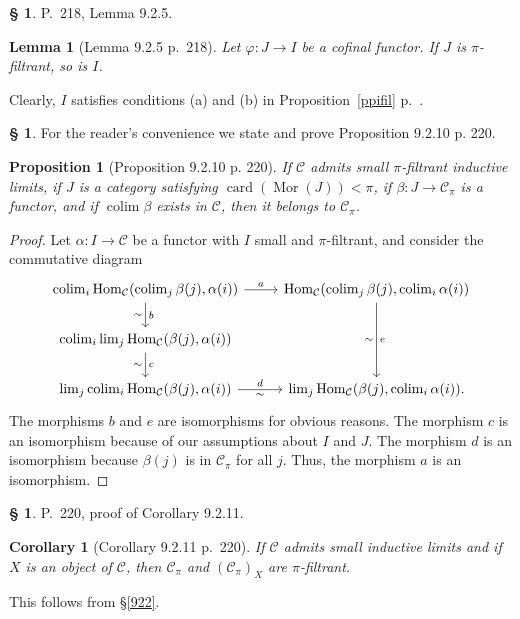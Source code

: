\documentclass[12pt]{article}
\newtheorem{lem}[thm]{Lemma}
\newtheorem{prop}[thm]{Proposition}
\newtheorem{cor}[thm]{Corollary}
\theoremstyle{remark}
\theoremstyle{definition}
\newtheorem{s}[thm]{\S}
\newcommand{\C}{\mathcal C}
\newcommand{\pp}{\varphi}
\DeclareMathOperator*{\colim}{colim}
\DeclareMathOperator{\card}{card}
\DeclareMathOperator{\Hom}{Hom}
\DeclareMathOperator{\Mor}{Mor}
\begin{document}
%

\begin{s}
P.~218, Lemma 9.2.5. 

\begin{lem}[Lemma 9.2.5 p.~218] 
Let $\pp:J\to I$ be a cofinal functor. If $J$ is $\pi$-filtrant, so is $I$.
\end{lem}

Clearly, $I$ satisfies conditions (a) and (b) in Proposition~\ref{ppifil} p.~\pageref{ppifil}. 
\end{s}

%

\begin{s}
For the reader's convenience we state and prove Proposition 9.2.10 p. 220. 

\begin{prop}[Proposition 9.2.10 p. 220]
If $\C$ admits small $\pi$-filtrant inductive limits, if $J$ is a category satisfying $\card(\Mor(J))<\pi$, if $\beta:J\to\C_\pi$ is a functor, and if $\colim\beta$ exists in $\C$, then it belongs to $\C_\pi$. 
\end{prop}

\begin{proof}
Let $\alpha:I\to\C$ be a functor with $I$ small and $\pi$-filtrant, and consider the commutative diagram
$$
\begin{tikzcd}
\colim_i\Hom_\C(\colim_j\beta(j),\alpha(i))\ar{r}{a}\ar{d}{b}[swap]{\sim}&\Hom_\C(\colim_j\beta(j),\colim_i\alpha(i))\ar{dd}{e}[swap]{\sim}\\ 
\colim_i\lim_j\Hom_\C(\beta(j),\alpha(i))\ar{d}{c}[swap]{\sim}\\ 
\lim_j\colim_i\Hom_\C(\beta(j),\alpha(i))\ar{r}{d}[swap]{\sim}&\lim_j\Hom_\C(\beta(j),\colim_i\alpha(i)).
\end{tikzcd}
$$ 
The morphisms $b$ and $e$ are isomorphisms for obvious reasons. The morphism $c$ is an isomorphism because of our assumptions about $I$ and $J$. The morphism $d$ is an isomorphism because $\beta(j)$ is in $\C_\pi$ for all $j$. Thus, the morphism $a$ is an isomorphism. 
\end{proof}
\end{s}

%

\begin{s} 
P.~220, proof of Corollary 9.2.11. 

\begin{cor}[Corollary 9.2.11 p.~220] 
If $\C$ admits small inductive limits and if $X$ is an object of $\C$, then $\C_\pi$ and $(\C_\pi)_X$ are $\pi$-filtrant. 
\end{cor}

This follows from \S\ref{922}.
\end{s}
\end{document}
